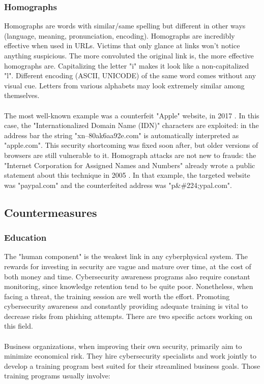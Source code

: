 \documentclass[a4paper]{article}
\begin{document}
\subsubsection{{Homographs}}

Homographs are words with similar/same spelling but different in other ways (language, meaning, pronunciation, encoding). Homographs are incredibly effective when used in URLs. Victims that only glance at links won't notice anything suspicious. The more convoluted the original link is, the more effective homographs are. Capitalizing the letter "i" makes it look like a non-capitalized "l". Different encoding (ASCII, UNICODE) of the same word comes without any visual cue. Letters from various alphabets may look extremely similar among themselves.
\\ \\
The most well-known example was a counterfeit "Apple" website, in 2017 \cite{article-apple-homograph}. In this case, the "Internationalized Domain Name (IDN)" characters are exploited: in the address bar the string "xn--80ak6aa92e.com" is automatically interpreted as "apple.com". This security shortcoming was fixed soon after, but older versions of browsers are still vulnerable to it. Homograph attacks are not new to frauds: the "Internet Corporation for Assigned Names and Numbers" already wrote a public statement about this technique in 2005 \cite{article-icann-homograph}. In that example, the targeted website was "paypal.com" and the counterfeited address was "p\&\#224;ypal.com".

\subsection{Countermeasures}

\subsubsection{Education}

The "human component" is the weakest link in any cyberphysical system. The rewards for investing in security are vague and mature over time, at the cost of both money and time. Cybersecurity awareness programs also require constant monitoring, since knowledge retention tend to be quite poor. Nonetheless, when facing a threat, the training session are well worth the effort. Promoting cybersecurity awareness and constantly providing adequate training is vital to decrease risks from phishing attempts. There are two specific actors working on this field.
\\ \\
Business organizations, when improving their own security, primarily aim to minimize economical risk. They hire cybersecurity specialists and work jointly to develop a training program best suited for their streamlined business goals. Those training programs usually involve:
\end{document}
